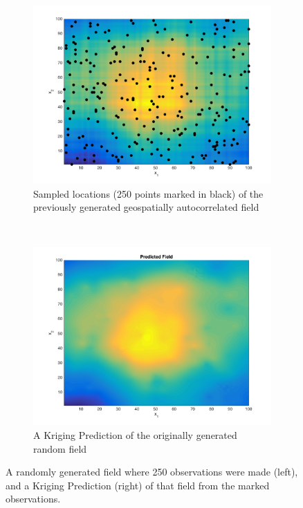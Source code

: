 \documentclass[11pt]{ucthesis}
\begin{document}
\begin{figure}[ht!]
    \centering
    \begin{subfigure}[t]{0.5\textwidth}
        \centering
        \includegraphics[width=\linewidth]{figures/sampled_generated_field.png}
        \captionsetup{skip=0.5\baselineskip, width=0.8\textwidth, size=footnotesize}
        \caption{Sampled locations (250 points marked in black) of the previously generated geospatially autocorrelated field}
        \label{fig:sampled_field}
    \end{subfigure}%
    ~ 
    \begin{subfigure}[t]{0.5\textwidth}
        \centering
        \includegraphics[width=\linewidth]{figures/kriging_top_pred_field.png}
        \captionsetup{skip=0.5\baselineskip, width=0.8\textwidth, size=footnotesize}
        \caption{A Kriging Prediction of the originally generated random field}
        \label{fig:krig_field}
    \end{subfigure}
    \captionsetup{skip=0.5\baselineskip,size=footnotesize}
    \caption{A randomly generated field where 250 observations were made (left), and a Kriging Prediction (right) of that field from the marked observations.}
    \label{fig:krig_side_by_side}
\end{figure}
\end{document}
